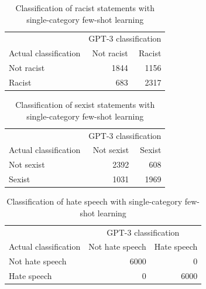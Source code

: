 \documentclass[12pt,]{article}
\begin{document}
\begin{table}[!h]

\caption{\label{tab:fewshotsingle-racism}Classification of racist statements with single-category few-shot learning}
\centering
\fontsize{8}{10}\selectfont
\begin{tabular}[t]{lrr}
\toprule
\multicolumn{1}{c}{ } & \multicolumn{2}{c}{GPT-3 classification} \\
\cmidrule(l{3pt}r{3pt}){2-3}
Actual classification & Not racist & Racist\\
\midrule
Not racist & 1844 & 1156\\
Racist & 683 & 2317\\
\bottomrule
\end{tabular}
\end{table}

\begin{table}[!h]

\caption{\label{tab:fewshotsingle-sexism}Classification of sexist statements with single-category few-shot learning}
\centering
\fontsize{8}{10}\selectfont
\begin{tabular}[t]{lrr}
\toprule
\multicolumn{1}{c}{ } & \multicolumn{2}{c}{GPT-3 classification} \\
\cmidrule(l{3pt}r{3pt}){2-3}
Actual classification & Not sexist & Sexist\\
\midrule
Not sexist & 2392 & 608\\
Sexist & 1031 & 1969\\
\bottomrule
\end{tabular}
\end{table}

\begin{table}[!h]

\caption{\label{tab:fewshotsingle-hate}Classification of hate speech with single-category few-shot learning}
\centering
\fontsize{8}{10}\selectfont
\begin{tabular}[t]{lrr}
\toprule
\multicolumn{1}{c}{ } & \multicolumn{2}{c}{GPT-3 classification} \\
\cmidrule(l{3pt}r{3pt}){2-3}
Actual classification & Not hate speech & Hate speech\\
\midrule
Not hate speech & 6000 & 0\\
Hate speech & 0 & 6000\\
\bottomrule
\end{tabular}
\end{table}

\newpage
\end{document}
